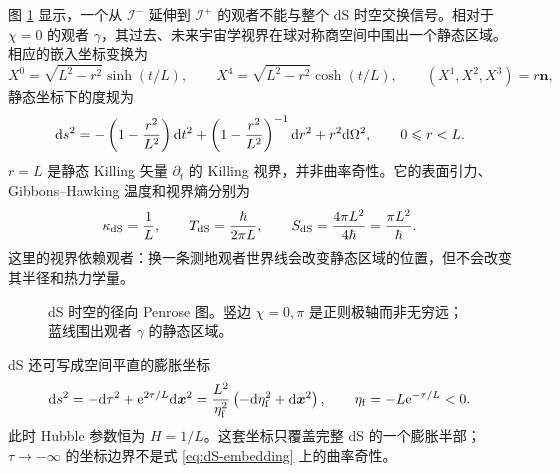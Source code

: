 图 \ref{fig:dS-penrose} 显示，一个从 $\mathscr I^-$ 延伸到 $\mathscr I^+$ 的观者不能与整个 dS 时空交换信号。相对于 $\chi=0$ 的观者 $\gamma$，其过去、未来宇宙学视界在球对称商空间中围出一个静态区域。相应的嵌入坐标变换为
\[
    X^0=\sqrt{L^2-r^2}\sinh(t/L),\qquad
    X^4=\sqrt{L^2-r^2}\cosh(t/L),\qquad
    (X^1,X^2,X^3)=r\bm n,
\]
静态坐标下的度规为
\begin{equation}\label{eq:dS-static}
    \dd s^2=-\left(1-\frac{r^2}{L^2}\right)\dd t^2
      +\left(1-\frac{r^2}{L^2}\right)^{-1}\dd r^2+r^2\dd\Omega^2,
    \qquad 0\leqslant r<L.
\end{equation}
$r=L$ 是静态 Killing 矢量 $\partial_t$ 的 Killing 视界，并非曲率奇性。它的表面引力、Gibbons--Hawking 温度和视界熵分别为
\begin{equation}\label{eq:dS-thermodynamics}
    \kappa_{\rm dS}=\frac1L,
    \qquad T_{\rm dS}=\frac{\hbar}{2\pi L},
    \qquad S_{\rm dS}=\frac{4\pi L^2}{4\hbar}=\frac{\pi L^2}{\hbar}.
\end{equation}
这里的视界依赖观者：换一条测地观者世界线会改变静态区域的位置，但不会改变其半径和热力学量。

\begin{figure}[htbp]
    \centering
    \caption{dS 时空的径向 Penrose 图。竖边 $\chi=0,\pi$ 是正则极轴而非无穷远；蓝线围出观者 $\gamma$ 的静态区域。}
    \label{fig:dS-penrose}
\end{figure}

dS 还可写成空间平直的膨胀坐标
\begin{equation}\label{eq:dS-flat-slicing}
    \dd s^2=-\dd\tau^2+\mathrm{e}^{2\tau/L}\dd\bm x^2
      =\frac{L^2}{\eta_{\rm f}^2}
       \left(-\dd\eta_{\rm f}^2+\dd\bm x^2\right),
    \qquad \eta_{\rm f}=-L\mathrm{e}^{-\tau/L}<0.
\end{equation}
此时 Hubble 参数恒为 $H=1/L$。这套坐标只覆盖完整 dS 的一个膨胀半部；$\tau\to-\infty$ 的坐标边界不是式 \eqref{eq:dS-embedding} 上的曲率奇性。

